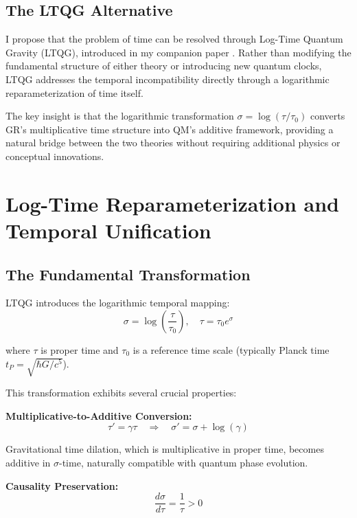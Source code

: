 \documentclass[12pt,a4paper]{article}
\begin{document}
\subsection{The LTQG Alternative}

I propose that the problem of time can be resolved through Log-Time Quantum Gravity (LTQG), introduced in my companion paper \cite{Greenwood2025}. Rather than modifying the fundamental structure of either theory or introducing new quantum clocks, LTQG addresses the temporal incompatibility directly through a logarithmic reparameterization of time itself.

The key insight is that the logarithmic transformation $\sigma = \log(\tau/\tau_0)$ converts GR's multiplicative time structure into QM's additive framework, providing a natural bridge between the two theories without requiring additional physics or conceptual innovations.

\section{Log-Time Reparameterization and Temporal Unification}

\subsection{The Fundamental Transformation}

LTQG introduces the logarithmic temporal mapping:
\begin{equation}
\boxed{\sigma = \log\left(\frac{\tau}{\tau_0}\right), \quad \tau = \tau_0 e^{\sigma}}
\label{eq:sigma_transform}
\end{equation}

where $\tau$ is proper time and $\tau_0$ is a reference time scale (typically Planck time $t_P = \sqrt{\hbar G/c^5}$).

This transformation exhibits several crucial properties:

\textbf{Multiplicative-to-Additive Conversion:}
\begin{equation}
\tau' = \gamma \tau \quad \Rightarrow \quad \sigma' = \sigma + \log(\gamma)
\label{eq:additive_conversion}
\end{equation}

Gravitational time dilation, which is multiplicative in proper time, becomes additive in $\sigma$-time, naturally compatible with quantum phase evolution.

\textbf{Causality Preservation:}
\begin{equation}
\frac{d\sigma}{d\tau} = \frac{1}{\tau} > 0
\end{equation}
\end{document}
